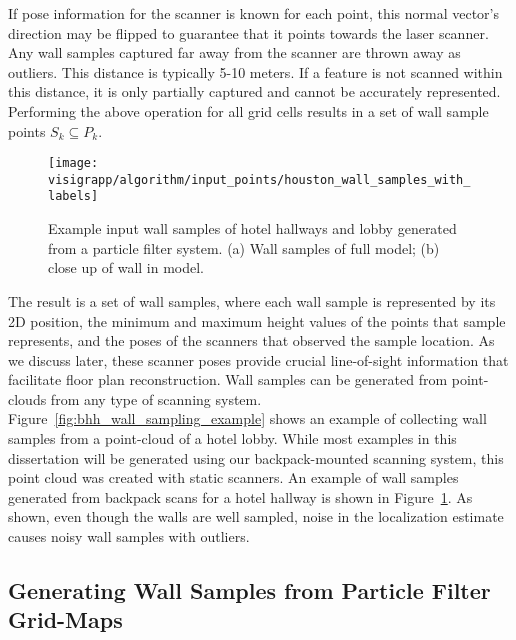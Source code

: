 \documentclass[12pt,onecolumn,oneside]{book}
\begin{document}
If pose information for the scanner is known for each point, this normal vector's direction may be flipped to guarantee that it points towards the laser scanner.  Any wall samples captured far away from the scanner are thrown away as outliers.  This distance is typically 5-10 meters.  If a feature is not scanned within this distance, it is only partially captured and cannot be accurately represented. Performing the above operation for all grid cells results in a set of wall sample points $S_k \subseteq P_k$.  

\begin{figure}
  \centering
  \texttt{[image: visigrapp/algorithm/input\_points/houston\_wall\_samples\_with\_labels]}
  \caption[Wall samples from backpack point cloud.]{Example input wall samples of hotel hallways and lobby generated from a particle filter system. (a) Wall samples of full model; (b) close up of wall in model.}
  \label{fig:backpack_wall_sample_example}
\end{figure}

The result is a set of wall samples, where each wall sample is represented by its 2D position, the minimum and maximum height values of the points that sample represents, and the poses of the scanners that observed the sample location.  As we discuss later, these scanner poses provide crucial line-of-sight information that facilitate floor plan reconstruction.  Wall samples can be generated from point-clouds from any type of scanning system.  Figure~\ref{fig:bhh_wall_sampling_example} shows an example of collecting wall samples from a point-cloud of a hotel lobby.  While most examples in this dissertation will be generated using our backpack-mounted scanning system, this point cloud was created with static scanners. An example of wall samples generated from backpack scans for a hotel hallway is shown in Figure~\ref{fig:backpack_wall_sample_example}.  As shown, even though the walls are well sampled, noise in the localization estimate causes noisy wall samples with outliers.

\subsection{Generating Wall Samples from Particle Filter Grid-Maps}
\label{ssec:ws_from_pf}
\end{document}
